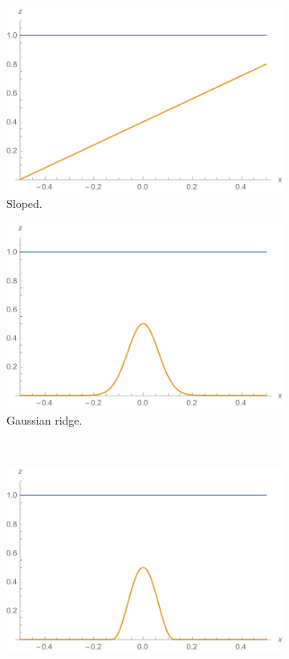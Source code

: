 \begin{figure}
  \centering
  \begin{subfigure}{0.45\textwidth}
    \includegraphics[width=\textwidth]{diagrams/bath-slope}
    \caption{Sloped.}
    \label{fig:bath-slope}
  \end{subfigure}
  \begin{subfigure}{0.45\textwidth}
    \includegraphics[width=\textwidth]{diagrams/bath-gaussian}
    \caption{Gaussian ridge.}
    \label{fig:bath-gaussian}
  \end{subfigure} \\
  \begin{subfigure}{0.45\textwidth}
    \includegraphics[width=\textwidth]{diagrams/bath-cosine}

\end{subfigure}
\end{figure}

